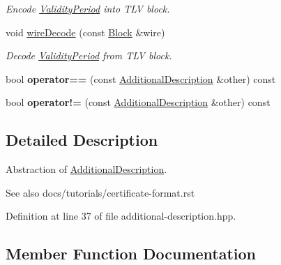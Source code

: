 \begin{DoxyCompactItemize}
\begin{DoxyCompactList}\small\item\em Encode \hyperlink{classndn_1_1security_1_1ValidityPeriod}{Validity\+Period} into T\+LV block. \end{DoxyCompactList}\item 
void \hyperlink{classndn_1_1security_1_1AdditionalDescription_adc5e5c26c674d3c85d3bc5b66d26c42a}{wire\+Decode} (const \hyperlink{classndn_1_1Block}{Block} \&wire)
\begin{DoxyCompactList}\small\item\em Decode \hyperlink{classndn_1_1security_1_1ValidityPeriod}{Validity\+Period} from T\+LV block. \end{DoxyCompactList}\item 
bool {\bfseries operator==} (const \hyperlink{classndn_1_1security_1_1AdditionalDescription}{Additional\+Description} \&other) const\hypertarget{classndn_1_1security_1_1AdditionalDescription_a567f13cf876b0536688631859be2b86e}{}\label{classndn_1_1security_1_1AdditionalDescription_a567f13cf876b0536688631859be2b86e}

\item 
bool {\bfseries operator!=} (const \hyperlink{classndn_1_1security_1_1AdditionalDescription}{Additional\+Description} \&other) const\hypertarget{classndn_1_1security_1_1AdditionalDescription_a73b0aa1b38c060e97abe03b22909577e}{}\label{classndn_1_1security_1_1AdditionalDescription_a73b0aa1b38c060e97abe03b22909577e}

\end{DoxyCompactItemize}


\subsection{Detailed Description}
Abstraction of \hyperlink{classndn_1_1security_1_1AdditionalDescription}{Additional\+Description}. 

\begin{DoxySeeAlso}{See also}
docs/tutorials/certificate-\/format.\+rst 
\end{DoxySeeAlso}


Definition at line 37 of file additional-\/description.\+hpp.



\subsection{Member Function Documentation}
